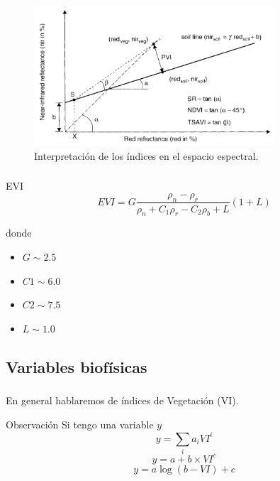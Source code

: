 \documentclass[]{beamer}
\begin{document}
\begin{frame}
    \frametitle{\subsecname}
    \begin{figure}
    \begin{center}
        \includegraphics[width=0.8\textwidth]{imagenes/int_graf.png}
    \end{center}
    \caption{Interpretación de los índices en el espacio
        espectral.}
    \end{figure}
\end{frame}

\begin{frame}
    \frametitle{\subsecname}
    \begin{block}{EVI}
        \begin{equation}
            EVI = G\frac{\rho_n - \rho_r}{\rho_n+C_1\rho_r-C_2\rho_b+L}(1+L) 
        \end{equation}
    \end{block}
    donde
    \begin{itemize}
        \item $G  \sim 2.5$
        \item $C1 \sim 6.0$
        \item $C2 \sim 7.5$
        \item $L  \sim 1.0$
    \end{itemize}
\end{frame}

\subsection{Variables biofísicas}

\begin{frame}
    \frametitle{\subsecname}
    En general hablaremos de índices de Vegetación (VI).\pause\
    \begin{block}{Observación}
        Si tengo una variable $y$\pause\
        \begin{equation}
            y = \sum_i a_i VI^i
        \end{equation}
        \begin{equation}
            y = a + b \times VI^c
        \end{equation}
        \begin{equation}
            y = a \log(b-VI)+c
        \end{equation}
    \end{block}
\end{frame}
\end{document}
